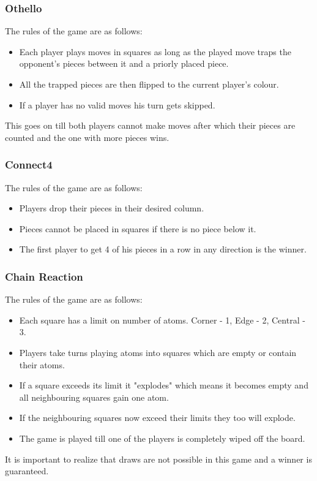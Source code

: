\documentclass[12pt, letter]{article}
\begin{document}
\subsubsection{Othello}
The rules of the game are as follows:
\begin{itemize}
    \item Each player plays moves in squares as long as the played move traps the opponent's pieces between it and a priorly placed piece. 
    \item All the trapped pieces are then flipped to the current player's colour.
    \item If a player has no valid moves his turn gets skipped.
    
\end{itemize}
This goes on till both players cannot make moves after which their pieces are counted and the one with more pieces wins.

\subsubsection{Connect4}
The rules of the game are as follows:
\begin{itemize}
    \item Players drop their pieces in their desired column.
    \item Pieces cannot be placed in squares if there is no piece below it.
    \item The first player to get 4 of his pieces in a row in any direction is the winner.
    
\end{itemize}


\subsubsection{Chain Reaction}
The rules of the game are as follows:
\begin{itemize}
    \item Each square has a limit on number of atoms. Corner - 1, Edge - 2, Central - 3.
    \item Players take turns playing atoms into squares which are empty or contain their atoms.
    \item If a square exceeds its limit it "explodes" which means it becomes empty and all neighbouring squares gain one atom.
    \item If the neighbouring squares now exceed their limits they too will explode.
    \item The game is played till one of the players is completely wiped off the board.
    
\end{itemize}
It is important to realize that draws are not possible in this game and a winner is guaranteed.
\end{document}
